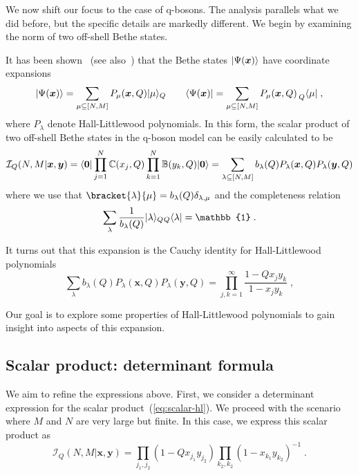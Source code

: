 \documentclass[a4paper,11pt]{amsart}
\begin{document}
We now shift our focus to the case of q-bosons. The analysis parallels
what we did before, but the specific details are markedly
different. We begin by examining the norm of two off-shell Bethe
states.

It has been shown~\cite{Tsilevich:2006} (see
also~\cite{Sulkowski:2008mx, Wheeler:2010vmq}) that the Bethe states
\(\lvert\Psi(\bm{x})\rangle\) have coordinate expansions
\begin{equation}
  \lvert\Psi(\bm{x})\rangle = \sum_{\mu \subseteq [N,M]} P_\mu(\bm{x}, Q) \lvert\mu\rangle_Q  \qquad 
  \langle\Psi(\bm{x})\rvert = \sum_{\mu \subseteq [N,M]} P_\mu(\bm{x}, Q) \prescript{}{Q}{\langle\mu\rvert}\; ,
\end{equation}
where \(P_\lambda\) denote Hall-Littlewood polynomials. In this form,
the scalar product of two off-shell Bethe states in the q-boson model
can be easily calculated to be
\begin{equation}
\label{eq:scalar-hl}
\mathcal{I}_Q(N,M | \bm{x}, \bm{y}) = \langle\bm{0}\rvert \prod_{j=1}^N \mathbb{C}(x_j, Q)
\prod_{k=1}^N \mathbb{B}(y_k, Q) \lvert\bm{0}\rangle
= \sum_{\lambda \subseteq [N,M]} b_\lambda(Q) P_{\lambda}(\bm{x}, Q) P_{\lambda}(\bm{y}, Q)
\end{equation}
where we use that \(\bracket{\lambda}{\mu} = b_\lambda(Q)
\delta_{\lambda, \mu}\) and the completeness relation
\begin{equation}
  \sum_{\lambda} \frac{1}{b_\lambda(Q)} \ket{\lambda}_Q {}_Q\bra{\lambda}  = \mathbb{1}\; .
\end{equation}

It turns out that this expansion is the Cauchy identity for
Hall-Littlewood polynomials~\cite{Macdonald:1998}
\begin{equation}
\label{eq:cauchy_hl}
\sum_{\lambda} b_\lambda(Q) P_{\lambda}(\bm{x}, Q) P_{\lambda}(\bm{y}, Q)
= \prod_{j, k=1}^\infty \frac{1-Q x_j y_k}{1 - x_j y_k}\; ,
\end{equation}

Our goal is to explore some properties of Hall-Littlewood polynomials
to gain insight into aspects of this expansion.


\subsection{Scalar product: determinant formula}
We aim to refine the expressions above. First, we consider a
determinant expression for the scalar product~(\ref{eq:scalar-hl}). We
proceed with the scenario where \(M\) and \(N\) are very large but
finite. In this case, we express this scalar product as
\begin{equation}
\label{eq:q-inner}
  \mathcal{I}_Q(N,M | \bm{x}, \bm{y})  
= \prod_{j_1, j_2} (1-Q x_{j_1} y_{j_2}) \prod_{k_2, k_2}(1 - x_{k_1} y_{k_2})^{-1}\; .
\end{equation}
\end{document}
